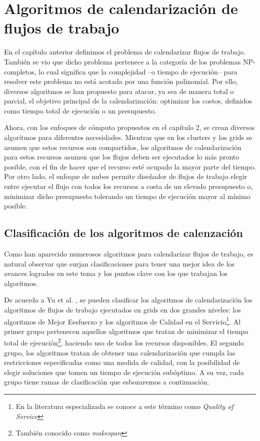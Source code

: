 \chapter{Algoritmos de calendarización de flujos de trabajo}
En el capítulo anterior definimos el problema de calendarizar flujos de trabajo. También se vio que dicho problema pertenece a la categoría de los problemas NP-completos, lo cual significa que la complejidad --o tiempo de ejecución-- para resolver este problema no está acotada por una función polinomial. Por ello, diversos algoritmos se han propuesto para atacar, ya sea de manera total o parcial, el objetivo principal de la calendarización: optimizar los costos, definidos como tiempo total de ejecución o un presupuesto.

Ahora, con los enfoques de cómputo propuestos en el capítulo 2, se crean diversos algoritmos para diferentes necesidades. Mientras que en los clusters y los grids se asumen que estos recursos son compartidos, los algoritmos de calendarización para estos recursos asumen que los flujos deben ser ejecutados lo más pronto posible, con el fin de hacer que el recurso esté ocupado la mayor parte del tiempo. Por otro lado, el enfoque de nubes permite diseñador de flujos de trabajo elegir entre ejecutar el flujo con todos los recursos a costa de un elevado presupuesto o, minimizar dicho presupuesto tolerando un tiempo de ejecución mayor al mínimo posible.

\section{Clasificación de los algoritmos de calenzación}
Como han aparecido numerosos algoritmos para calendarizar flujos de trabajo, es natural observar que surjan clasificaciones \cite{topcuoglu2002performance} \cite{yu2008workflow} para tener una mejor idea de los avances logrados en este tema y los puntos clave con los que trabajan los algoritmos.

De acuerdo a Yu et al. \cite{yu2008workflow}, se pueden clasificar los algoritmos de calendarización los algoritmos de flujos de trabajo ejecutados en grids en dos grandes niveles: los algoritmos de Mejor Eesfuerzo y los algoritmos de Calidad en el Servicio\footnote{En la literatura especializada se conoce a este término como \emph{Quality of Service}}. Al primer grupo pertenecen aquellos algoritmos que tratan de minimizar el tiempo total de ejecución\footnote{También conocido como \emph{makespan}}, haciendo uso de todos los recursos disponibles. El segundo grupo, los algoritmos tratan de obtener una calendarización que cumpla las restricciones especificadas como una medida de calidad, con la posibilidad de elegir soluciones que tomen un tiempo de ejecución subóptimo. A su vez, cada grupo tiene ramas de clasificación que esbozaremos a continuación.

